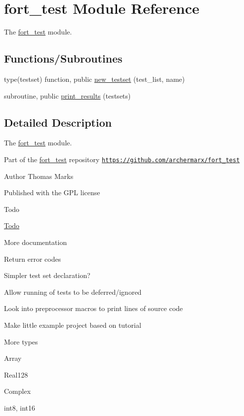 \hypertarget{namespacefort__test}{}\section{fort\+\_\+test Module Reference}
\label{namespacefort__test}


The \hyperlink{namespacefort__test}{fort\+\_\+test} module.  


\subsection*{Functions/\+Subroutines}
\begin{DoxyCompactItemize}
\item 
type(testset) function, public \hyperlink{namespacefort__test_ac1b02a037c4855a5530ae89a6e70cace}{new\+\_\+testset} (test\+\_\+list, name)
\item 
subroutine, public \hyperlink{namespacefort__test_ab48fbb70a5c3df67c8965725d8a6f8e2}{print\+\_\+results} (testsets)
\end{DoxyCompactItemize}


\subsection{Detailed Description}
The \hyperlink{namespacefort__test}{fort\+\_\+test} module. 

Part of the \hyperlink{namespacefort__test}{fort\+\_\+test} repository \href{https://github.com/archermarx/fort_test}{\tt https\+://github.\+com/archermarx/fort\+\_\+test} \begin{DoxyAuthor}{Author}
Thomas Marks
\end{DoxyAuthor}
Published with the G\+PL license \begin{DoxyRefDesc}{Todo}
\item[\hyperlink{todo__todo000001}{Todo}]
\begin{DoxyItemize}
\item More documentation
\item Return error codes
\item Simpler test set declaration?
\item Allow running of tests to be deferred/ignored
\item Look into preprocessor macros to print lines of source code
\item Make little example project based on tutorial
\item More types
\begin{DoxyItemize}
\item Array
\item Real128
\item Complex
\item int8, int16 
\end{DoxyItemize}
\end{DoxyItemize}\end{DoxyRefDesc}


